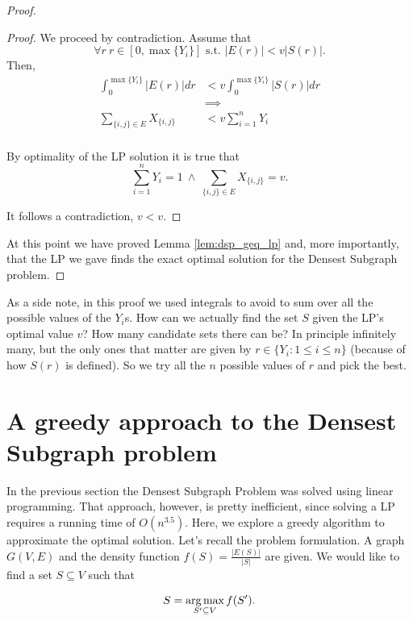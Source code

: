\begin{proof}
\begin{proof}
	We proceed by contradiction. Assume that
	\begin{equation}
	\forall r\ r \in [0, \max{\{Y_i\}}] \text{ s.t. }  |E(r)| < v|S(r)|.
	\end{equation}
	Then,
	\begin{align}
	\int_0^{\max{\{Y_i\}}}|E(r)| dr &< v\int_0^{\max{\{Y_i\}}}|S(r)| dr\\\
	&\implies\\
		\sum_{\{i, j\} \in E} X_{\{i, j\}} &< v \sum_{i = 1}^n Y_i\\
	\end{align}
	
	By optimality of the LP solution it is true that
	\begin{equation}
	\sum_{i = 1}^n Y_i = 1\ \wedge\ 	\sum_{\{i, j\} \in E} X_{\{i, j\}} = v.
	\end{equation}
	
	It follows a contradiction, $ v < v$.
\end{proof}
At this point we have proved Lemma \ref{lem:dsp_geq_lp} and, more importantly, that the LP we gave finds the exact optimal solution for the Densest Subgraph problem.
\end{proof}

As a side note, in this proof we used integrals to avoid to sum over all the possible values of the $Y_i$s. How can we actually find the set $S$ given the LP's optimal value $v$? How many candidate sets there can be? In principle infinitely many, but the only ones that matter are given by $r \in \{Y_i : 1 \leq i \leq n\}$ (because of how $S(r)$ is defined). So we try all the $n$ possible values of $r$ and pick the best.

\section{A greedy approach to the Densest Subgraph problem}

In the previous section the Densest Subgraph Problem was solved using linear programming. That approach, however, is pretty inefficient, since solving a LP requires a running time of $O(n^{3.5})$. Here, we explore a greedy algorithm to approximate the optimal solution. Let's recall the problem formulation. A graph $G(V, E)$ and the density function $f(S) = \frac{|E(S)|}{|S|}$ are given. We would like to find a set $S \subseteq V$ such that

\begin{equation}
S = \operatorname*{arg\,max}_{S' \subseteq V} f(S').
\end{equation}

